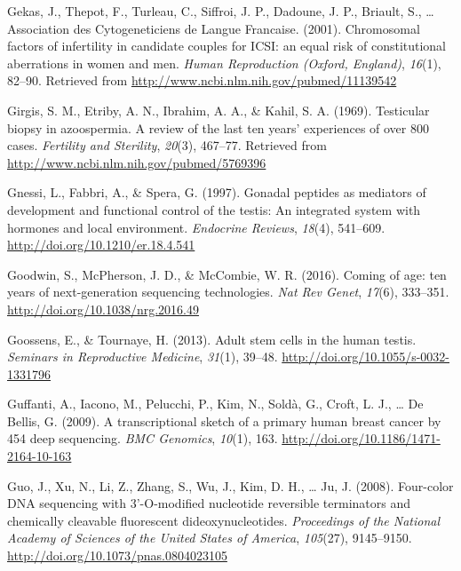 \documentclass[12pt,twoside]{reedthesis}
\theoremstyle{definition}
\theoremstyle{definition}
\theoremstyle{remark}
\begin{document}
  \hypertarget{ref-Gekas2001}{}
  Gekas, J., Thepot, F., Turleau, C., Siffroi, J. P., Dadoune, J. P.,
  Briault, S., \ldots{} Association des Cytogeneticiens de Langue
  Francaise. (2001). Chromosomal factors of infertility in candidate
  couples for ICSI: an equal risk of constitutional aberrations in women
  and men. \emph{Human Reproduction (Oxford, England)}, \emph{16}(1),
  82--90. Retrieved from \url{http://www.ncbi.nlm.nih.gov/pubmed/11139542}
  
  \hypertarget{ref-Girgis}{}
  Girgis, S. M., Etriby, A. N., Ibrahim, A. A., \& Kahil, S. A. (1969).
  Testicular biopsy in azoospermia. A review of the last ten years'
  experiences of over 800 cases. \emph{Fertility and Sterility},
  \emph{20}(3), 467--77. Retrieved from
  \url{http://www.ncbi.nlm.nih.gov/pubmed/5769396}
  
  \hypertarget{ref-Gnessi1997}{}
  Gnessi, L., Fabbri, A., \& Spera, G. (1997). Gonadal peptides as
  mediators of development and functional control of the testis: An
  integrated system with hormones and local environment. \emph{Endocrine
  Reviews}, \emph{18}(4), 541--609.
  \url{http://doi.org/10.1210/er.18.4.541}
  
  \hypertarget{ref-Goodwin2016}{}
  Goodwin, S., McPherson, J. D., \& McCombie, W. R. (2016). Coming of age:
  ten years of next-generation sequencing technologies. \emph{Nat Rev
  Genet}, \emph{17}(6), 333--351. \url{http://doi.org/10.1038/nrg.2016.49}
  
  \hypertarget{ref-Goossens2013}{}
  Goossens, E., \& Tournaye, H. (2013). Adult stem cells in the human
  testis. \emph{Seminars in Reproductive Medicine}, \emph{31}(1), 39--48.
  \url{http://doi.org/10.1055/s-0032-1331796}
  
  \hypertarget{ref-Guffanti2009}{}
  Guffanti, A., Iacono, M., Pelucchi, P., Kim, N., Soldà, G., Croft, L.
  J., \ldots{} De Bellis, G. (2009). A transcriptional sketch of a primary
  human breast cancer by 454 deep sequencing. \emph{BMC Genomics},
  \emph{10}(1), 163. \url{http://doi.org/10.1186/1471-2164-10-163}
  
  \hypertarget{ref-Guo2008}{}
  Guo, J., Xu, N., Li, Z., Zhang, S., Wu, J., Kim, D. H., \ldots{} Ju, J.
  (2008). Four-color DNA sequencing with 3'-O-modified nucleotide
  reversible terminators and chemically cleavable fluorescent
  dideoxynucleotides. \emph{Proceedings of the National Academy of
  Sciences of the United States of America}, \emph{105}(27), 9145--9150.
  \url{http://doi.org/10.1073/pnas.0804023105}
  
\end{document}
